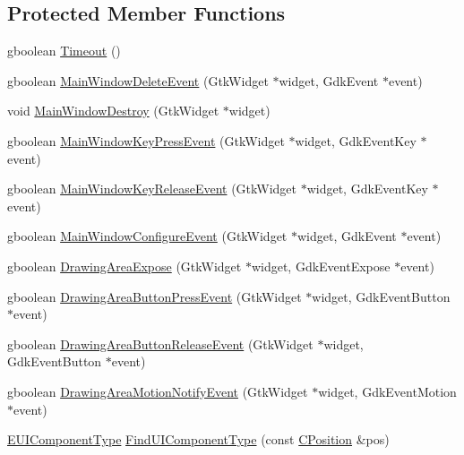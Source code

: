 \subsection*{Protected Member Functions}
\begin{DoxyCompactItemize}
\item 
gboolean \hyperlink{classCApplicationData_aae0775b38fac01308e8a81b64db49500}{Timeout} ()
\item 
gboolean \hyperlink{classCApplicationData_afd73780d7dca117edbe341cb3c908c04}{Main\+Window\+Delete\+Event} (Gtk\+Widget $\ast$widget, Gdk\+Event $\ast$event)
\item 
void \hyperlink{classCApplicationData_a202437b2380956a5519722937cd9f96a}{Main\+Window\+Destroy} (Gtk\+Widget $\ast$widget)
\item 
gboolean \hyperlink{classCApplicationData_a9b451765c93ecf00322f5450d29bfffe}{Main\+Window\+Key\+Press\+Event} (Gtk\+Widget $\ast$widget, Gdk\+Event\+Key $\ast$event)
\item 
gboolean \hyperlink{classCApplicationData_aff9f46bccd458a0dcca968e4a46c7d9b}{Main\+Window\+Key\+Release\+Event} (Gtk\+Widget $\ast$widget, Gdk\+Event\+Key $\ast$event)
\item 
gboolean \hyperlink{classCApplicationData_a7abef8a548d0ad3adb70f11d8a74176c}{Main\+Window\+Configure\+Event} (Gtk\+Widget $\ast$widget, Gdk\+Event $\ast$event)
\item 
gboolean \hyperlink{classCApplicationData_ae998e896194920e08f69f321f3bc9500}{Drawing\+Area\+Expose} (Gtk\+Widget $\ast$widget, Gdk\+Event\+Expose $\ast$event)
\item 
gboolean \hyperlink{classCApplicationData_ae7516e29f629998e4068ae1584d0237c}{Drawing\+Area\+Button\+Press\+Event} (Gtk\+Widget $\ast$widget, Gdk\+Event\+Button $\ast$event)
\item 
gboolean \hyperlink{classCApplicationData_a7df4d71ef6fabf7eac740c95cfe3cd81}{Drawing\+Area\+Button\+Release\+Event} (Gtk\+Widget $\ast$widget, Gdk\+Event\+Button $\ast$event)
\item 
gboolean \hyperlink{classCApplicationData_a9b53201c01b399df18b02d1e93213e45}{Drawing\+Area\+Motion\+Notify\+Event} (Gtk\+Widget $\ast$widget, Gdk\+Event\+Motion $\ast$event)
\item 
\hyperlink{classCApplicationData_ad49585591fc53bff1c89bc512170280d}{E\+U\+I\+Component\+Type} \hyperlink{classCApplicationData_a1fb2747750babd9b82f51ce206ee6755}{Find\+U\+I\+Component\+Type} (const \hyperlink{classCPosition}{C\+Position} \&pos)
\item 

\end{DoxyCompactItemize}

